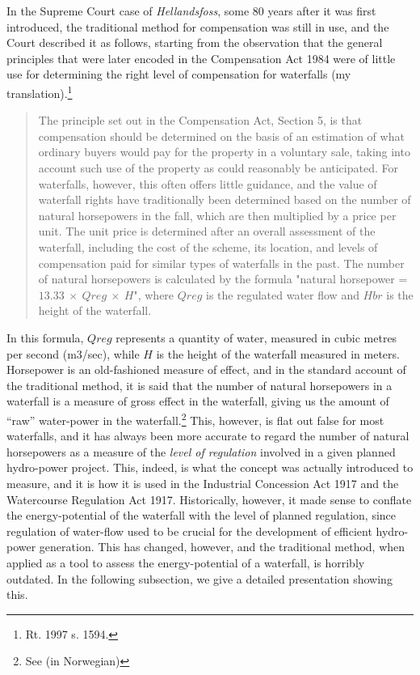 In the Supreme Court case of \emph{Hellandsfoss}, some 80 years after it was first introduced, the traditional method for compensation was still in use, and the Court described it as follows, starting from the observation that the general principles that were later encoded in the Compensation Act 1984 were of little use for determining the right level of compensation for waterfalls (my translation).\footnote{Rt. 1997 s. 1594.} 
\begin{quote}
The principle set out in the Compensation Act, Section 5, is that compensation should be determined on the basis of an estimation of what ordinary buyers would pay for the property in a voluntary sale, taking into account such use of the property as could reasonably be anticipated. For waterfalls, however, this often offers little guidance, and the value of waterfall rights have traditionally been determined based on the number of natural horsepowers in the fall, which are then multiplied by a price per unit. The unit price is determined after an overall assessment of the waterfall, including the cost of the scheme, its location, and levels of compensation paid for similar types of waterfalls in the past. The number of natural horsepowers is calculated by the formula "natural horsepower = $13.33 \ \times \ Qreg \ \times \ H$", where $Qreg$ is the regulated water flow and $Hbr$ is the height of the waterfall.
\end{quote}

In this formula, $Qreg$ represents a quantity of water, measured in cubic metres per second (m3/sec), while $H$ is the height of the waterfall measured in meters. Horsepower is an old-fashioned measure of effect, and in the standard account of the traditional method, it is said that the number of natural horsepowers in a waterfall is a measure of gross effect in the waterfall, giving us the amount of “raw” water-power in the waterfall.\footnote{See \cite{Falk}(in Norwegian)} This, however, is flat out false for most waterfalls, and it has always been more accurate to regard the number of natural horsepowers as a measure of the \emph{level of regulation} involved in a given planned hydro-power project. This, indeed, is what the concept was actually introduced to measure, and it is how it is used in the Industrial Concession Act 1917 and the Watercourse Regulation Act 1917. Historically, however, it made  sense to conflate the energy-potential of the waterfall with the level of planned regulation, since regulation of water-flow used to be crucial for the development of efficient hydro-power generation. This has changed, however, and the traditional method, when applied as a tool to assess the energy-potential of a waterfall, is horribly outdated. In the following subsection, we give a detailed presentation showing this.

